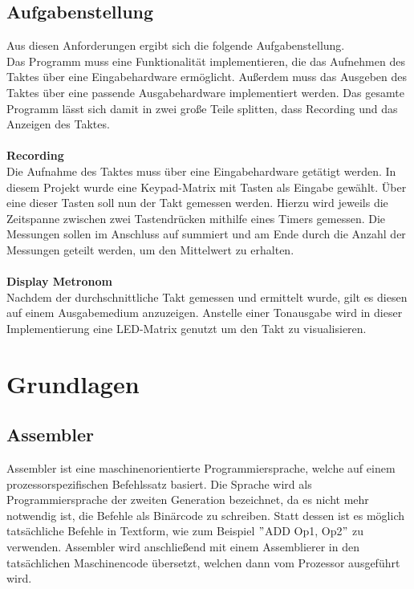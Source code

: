 \documentclass[a4paper, 12pt]{scrartcl}
\begin{document}
\begin{onehalfspace}
\subsection{Aufgabenstellung}
Aus diesen Anforderungen ergibt sich die folgende Aufgabenstellung.
\\
Das Programm muss eine Funktionalität implementieren, die das Aufnehmen des Taktes über eine Eingabehardware ermöglicht. Außerdem muss das Ausgeben des Taktes über eine passende Ausgabehardware implementiert werden.
Das gesamte Programm lässt sich damit in zwei große Teile splitten, dass Recording und das Anzeigen des Taktes.
\\
\\
\textbf{Recording}
\\
Die Aufnahme des Taktes muss über eine Eingabehardware getätigt werden. In diesem Projekt wurde eine Keypad-Matrix mit Tasten als Eingabe gewählt. Über eine dieser Tasten soll nun der Takt gemessen werden. Hierzu wird jeweils die Zeitspanne zwischen zwei Tastendrücken mithilfe eines Timers gemessen. Die Messungen sollen im Anschluss auf summiert und am Ende durch die Anzahl der Messungen geteilt werden, um den Mittelwert zu erhalten.
\\
\\
\textbf{Display Metronom}
\\
Nachdem der durchschnittliche Takt gemessen und ermittelt wurde, gilt es diesen auf einem Ausgabemedium anzuzeigen. Anstelle einer Tonausgabe wird in dieser Implementierung eine LED-Matrix genutzt um den Takt zu visualisieren.
\newpage
\section{Grundlagen}
\subsection{Assembler}
Assembler ist eine maschinenorientierte Programmiersprache, welche auf einem prozessorspezifischen Befehlssatz basiert. Die Sprache wird als Programmiersprache der zweiten Generation bezeichnet, da es nicht mehr notwendig ist, die Befehle als Binärcode zu schreiben. Statt dessen ist es möglich tatsächliche Befehle in Textform, wie zum Beispiel $"$ADD Op1, Op2$"$ zu verwenden. Assembler wird anschließend mit einem Assemblierer in den tatsächlichen Maschinencode übersetzt, welchen dann vom Prozessor ausgeführt wird.


\end{onehalfspace}
\end{document}

